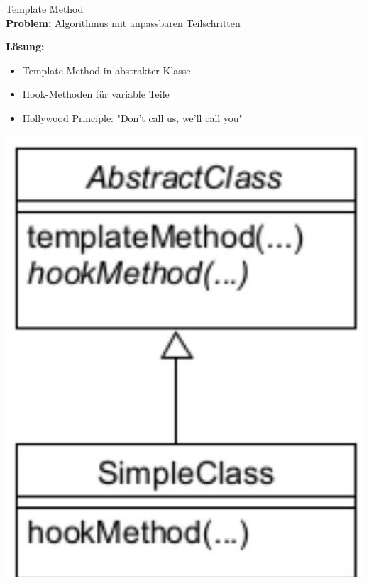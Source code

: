 \begin{concept}{Template Method}\\
\textbf{Problem:} Algorithmus mit anpassbaren Teilschritten

\begin{minipage}{0.6\textwidth}
\textbf{Lösung:}
\begin{itemize}
    \item Template Method in abstrakter Klasse
    \item Hook-Methoden für variable Teile
    \item Hollywood Principle: "Don't call us, we'll call you"
\end{itemize}
\end{minipage}
\begin{minipage}{0.4\textwidth}
\includegraphics[width=0.9\linewidth]{images/2025_01_02_73d93f10fa91ab6123dcg-22}
\end{minipage}
\end{concept}


